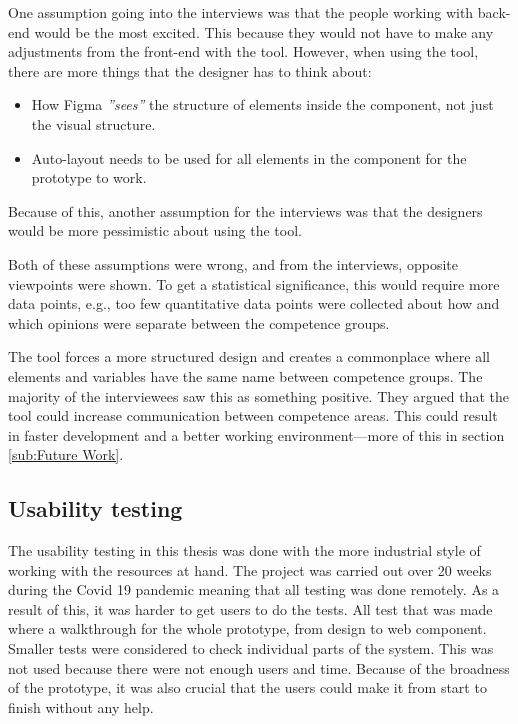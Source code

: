 One assumption going into the interviews was that the people working with back-end would be the most excited. This because they would not have to make any adjustments from the front-end with the tool. However, when using the tool, there are more things that the designer has to think about:
\begin{itemize}
  \item How Figma \textit{''sees''} the structure of elements inside the component, not just the visual structure.
  \item Auto-layout needs to be used for all elements in the component for the prototype to work. 
\end{itemize}

Because of this, another assumption for the interviews was that the designers would be more pessimistic about using the tool. 

Both of these assumptions were wrong, and from the interviews, opposite viewpoints were shown. To get a statistical significance, this would require more data points, e.g., too few quantitative data points were collected about how and which opinions were separate between the competence groups.

 The tool forces a more structured design and creates a commonplace where all elements and variables have the same name between competence groups. The majority of the interviewees saw this as something positive. They argued that the tool could increase communication between competence areas. This could result in faster development and a better working environment—more of this in section \ref{sub:Future Work}.

\subsection{Usability testing}%
\label{sub:Usability testing}
The usability testing in this thesis was done with the more industrial style of working with the resources at hand. The project was carried out over 20 weeks during the Covid 19 pandemic meaning that all testing was done remotely. As a result of this, it was harder to get users to do the tests. All test that was made where a walkthrough for the whole prototype, from design to web component. Smaller tests were considered to check individual parts of the system. This was not used because there were not enough users and time. Because of the broadness of the prototype, it was also crucial that the users could make it from start to finish without any help. 

